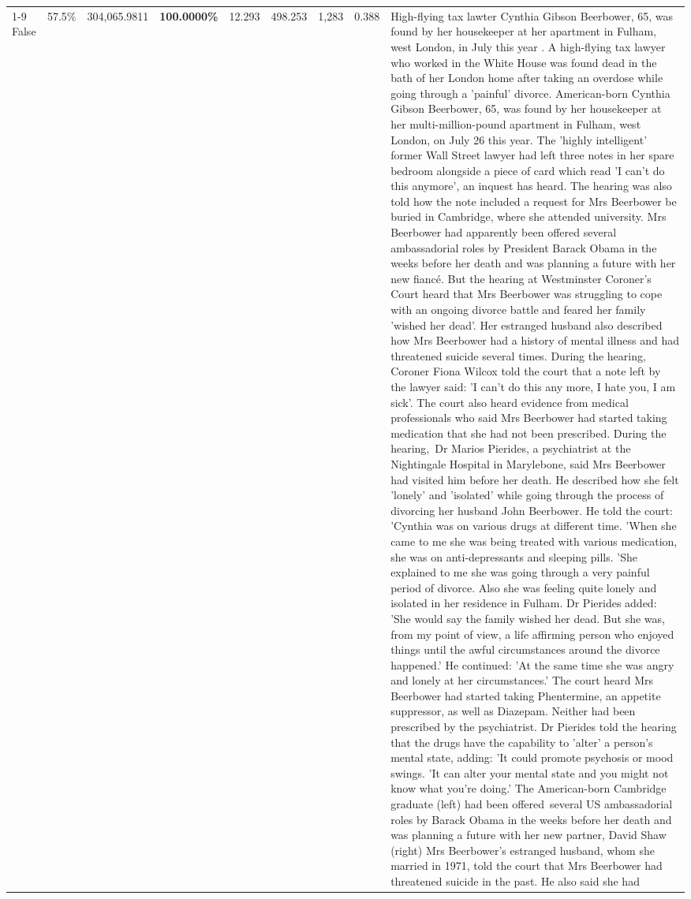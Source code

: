 \begin{table}[H]
\begin{tabular}{lllrlllll}
\cline{1-9}
False & 57.5\% & \color{red} 304,065.9811 & \bfseries \color{red} 100.0000\% & 12.293 & 498.253 & 1,283 & 0.388 & High-flying tax lawter Cynthia Gibson Beerbower, 65, was found by her housekeeper at her apartment in Fulham, west London, in July this year . A high-flying tax lawyer who worked in the White House was found dead in the bath of her London home after taking an overdose while going through a 'painful' divorce. American-born Cynthia Gibson Beerbower, 65, was found by her housekeeper at her multi-million-pound apartment in Fulham, west London, on July 26 this year. The 'highly intelligent' former Wall Street lawyer had left three notes in her spare bedroom alongside a piece of card which read 'I can't do this anymore', an inquest has heard. The hearing was also told how the note included a request for Mrs Beerbower be buried in Cambridge, where she attended university. Mrs Beerbower had apparently been offered several ambassadorial roles by President Barack Obama in the weeks before her death and was planning a future with her new fiancé. But the hearing at Westminster Coroner's Court heard that Mrs Beerbower was struggling to cope with an ongoing divorce battle and feared her family 'wished her dead'. Her estranged husband also described how Mrs Beerbower had a history of mental illness and had threatened suicide several times. During the hearing, Coroner Fiona Wilcox told the court that a note left by the lawyer said: 'I can't do this any more, I hate you, I am sick'. The court also heard evidence from medical professionals who said Mrs Beerbower had started taking medication that she had not been prescribed. During the hearing, Dr Marios Pierides, a psychiatrist at the Nightingale Hospital in Marylebone, said Mrs Beerbower had visited him before her death. He described how she felt 'lonely' and 'isolated' while going through the process of divorcing her husband John Beerbower. He told the court: 'Cynthia was on various drugs at different time. 'When she came to me she was being treated with various medication, she was on anti-depressants and sleeping pills. 'She explained to me she was going through a very painful period of divorce. Also she was feeling quite lonely and isolated in her residence in Fulham. Dr Pierides added: 'She would say the family wished her dead. But she was, from my point of view, a life affirming person who enjoyed things until the awful circumstances around the divorce happened.' He continued: 'At the same time she was angry and lonely at her circumstances.' The court heard Mrs Beerbower had started taking Phentermine, an appetite suppressor, as well as Diazepam. Neither had been prescribed by the psychiatrist. Dr Pierides told the hearing that the drugs have the capability to 'alter' a person's mental state, adding: 'It could promote psychosis or mood swings. 'It can alter your mental state and you might not know what you're doing.' The American-born Cambridge graduate (left) had been offered several US ambassadorial roles by Barack Obama in the weeks before her death and was planning a future with her new partner, David Shaw (right) Mrs Beerbower's estranged husband, whom she married in 1971, told the court that Mrs Beerbower had threatened suicide in the past. He also said she had 
\end{tabular}
\end{table}
